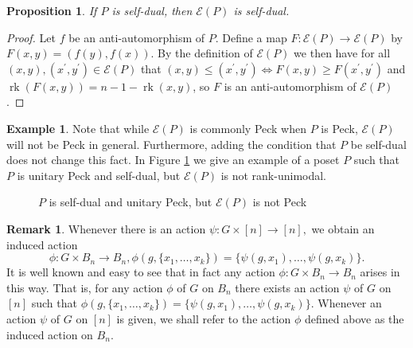 \documentclass[10 pt]{amsart}
\theoremstyle{plain}
\newtheorem{prop}[thm]{Proposition}
\theoremstyle{definition}
\newtheorem{rem}[thm]{Remark}
\newtheorem{eg}[thm]{Example}
\theoremstyle{remark}
\numberwithin{equation}{section}
\newcommand\rk{\operatorname{rk}}
\renewcommand{\iff}{\Leftrightarrow}
\begin{document}
\begin{prop}
If $P$ is self-dual, then $\mathcal{E}(P)$ is self-dual.
\end{prop}

\begin{proof}
Let $f$ be an anti-automorphism of $P$.  Define a map $F\colon \mathcal{E}(P)\rightarrow \mathcal{E}(P)$ by $F(x,y) = (f(y),f(x))$.  By the definition of $\mathcal{E}(P)$ we then have for all $(x,y),(x^\prime,y^\prime)\in \mathcal{E}(P)$ that $(x,y)\le (x^\prime,y^\prime)\iff F(x,y)\ge F(x^\prime,y^\prime)$ and $\rk(F(x,y)) = n-1-\rk(x,y)$, so $F$ is an anti-automorphism of $\mathcal{E}(P)$.
\end{proof}
\fi

\begin{eg}
Note that while $\mathcal{E}(P)$ is commonly Peck when $P$ is Peck, $\mathcal E(P)$ will not be Peck in general.  Furthermore, adding the condition that $P$ be self-dual does not change this fact.  In Figure \ref{fig:dual_not_unimodal} we give an example of a poset $P$ such that $P$ is unitary Peck and self-dual, but $\mathcal{E}(P)$ is not rank-unimodal.
\end{eg}

\begin{figure}[h]
\label{fig:dual_not_unimodal}
\qquad
{}
\caption{$P$ is self-dual and unitary Peck, but $\mathcal{E}(P)$ is not Peck}
\end{figure}


\begin{rem}
\label{rem:induced_action_bn}
Whenever there is an action $\psi:G \times [n] \rightarrow [n],$ we obtain an induced action 
$$\phi: G \times B_n \rightarrow B_n,\phi(g,\{x_1,\ldots, x_k\}) = \{\psi(g,x_1),\ldots, \psi(g,x_k)\}.$$
It is well known and easy to see that in fact any action $\phi:G \times B_n \rightarrow B_n$ arises in this way. That is, for any action $\phi$ of $G$ on $B_n$ there exists an action $\psi$ of $G$ on $[n]$ such that $\phi(g,\{x_1,\ldots, x_k\}) = \{\psi(g,x_1),\ldots, \psi(g,x_k)\}.$ Whenever an action $\psi$ of $G$ on $[n]$ is given, we shall refer to the action $\phi$ defined above as the induced action on $B_n.$
\end{rem}
\end{document}

